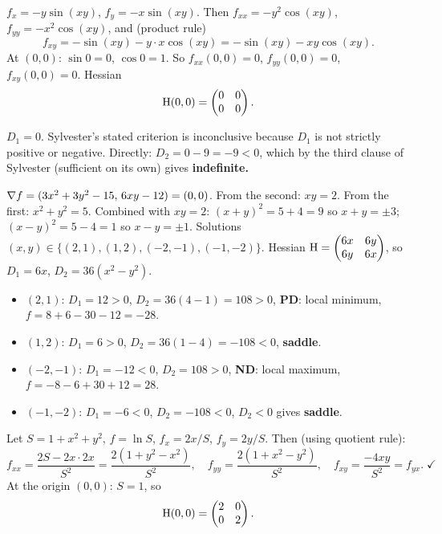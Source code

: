 \begin{solutions}
  \item $f_x = -y\sin(xy)$, $f_y = -x\sin(xy)$. Then
        $f_{xx} = -y^{2}\cos(xy)$, $f_{yy} = -x^{2}\cos(xy)$, and
        (product rule)
        \[
          f_{xy} = -\sin(xy) - y\cdot x\cos(xy) = -\sin(xy) - xy\cos(xy) .
        \]
        At $(0,0)$: $\sin 0=0$, $\cos 0=1$. So $f_{xx}(0,0)=0$,
        $f_{yy}(0,0)=0$, $f_{xy}(0,0)=0$. Hessian
        \[
          \operatorname{H}(0,0) = \begin{pmatrix}0&0\\0&0\end{pmatrix} .
        \]

  \item $D_1 = 0$. Sylvester's stated criterion is inconclusive because
        $D_1$ is not strictly positive or negative. Directly:
        $D_2 = 0-9 = -9 < 0$, which by the third clause of Sylvester
        (sufficient on its own) gives \textbf{indefinite.}

  \item $\nabla f = (3x^{2}+3y^{2}-15,\,6xy-12) = (0,0)$. From the second:
        $xy=2$. From the first: $x^{2}+y^{2}=5$. Combined with $xy=2$:
        $(x+y)^{2}=5+4=9$ so $x+y=\pm3$; $(x-y)^{2}=5-4=1$ so
        $x-y=\pm1$. Solutions $(x,y)\in\{(2,1),(1,2),(-2,-1),(-1,-2)\}$.
        Hessian $\operatorname{H} = \begin{pmatrix}6x&6y\\6y&6x\end{pmatrix}$, so
        $D_1=6x$, $D_2=36(x^{2}-y^{2})$.
        \begin{itemize}
          \item $(2,1)$: $D_1=12>0$, $D_2=36(4-1)=108>0$, \textbf{PD}:
                local minimum, $f=8+6-30-12=-28$.
          \item $(1,2)$: $D_1=6>0$, $D_2=36(1-4)=-108<0$, \textbf{saddle}.
          \item $(-2,-1)$: $D_1=-12<0$, $D_2=108>0$, \textbf{ND}: local
                maximum, $f=-8-6+30+12=28$.
          \item $(-1,-2)$: $D_1=-6<0$, $D_2=-108<0$, $D_2<0$ gives
                \textbf{saddle}.
        \end{itemize}

  \item Let $S=1+x^{2}+y^{2}$, $f=\ln S$, $f_x = 2x/S$, $f_y = 2y/S$.
        Then (using quotient rule):
        \[
          f_{xx} = \frac{2S-2x\cdot2x}{S^{2}} = \frac{2(1+y^{2}-x^{2})}{S^{2}}, \quad
          f_{yy} = \frac{2(1+x^{2}-y^{2})}{S^{2}}, \quad
          f_{xy} = \frac{-4xy}{S^{2}} = f_{yx} . \; \checkmark
        \]
        At the origin $(0,0)$: $S=1$, so
        \[
          \operatorname{H}(0,0) = \begin{pmatrix}2&0\\0&2\end{pmatrix} .
        \]


\end{solutions}
